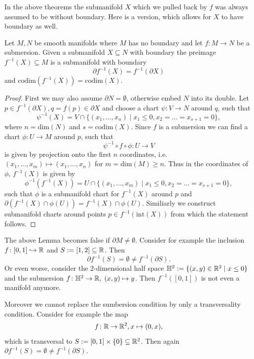     In the above theorems the submanifold $X$ which we pulled back by $f$ was always assumed to be without boundary. Here is a version, which allows for $X$ to have boundary as well.

    \begin{lemma}
        \label{on_mnf_with_boundary:lem:preimage_of_submersion}
            Let $M,N$ be smooth manifolds where $M$ has no boundary and let $f \colon M \to N$ be a submersion. Given a submanifold $X \subseteq N$ with boundary the preimage $f^{-1}(X) \subseteq M$ is a submanifold with boundary 
            \[
            \partial f^{-1}(X) = f^{-1}(\partial X)
            \]
            and $\mathrm{codim}(f^{-1}(X)) = \mathrm{codim}(X)$. 
        \end{lemma}
        \begin{proof}
            First we may also assume $\partial N = \emptyset$, otherwise embed $N$ into its double. Let $p \in f^{-1}(\partial X), q = f(p) \in \partial X$ and choose a chart $\psi \colon V \to N$ around $q$, such that 
            \[
            \psi^{-1}(X) = V \cap \{(x_1,\ldots,x_n) \mid x_1 \leq 0, x_2 = \ldots = x_{s+1} = 0\},
            \]
            where $n = \mathrm{dim}(N)$ and $s = \mathrm{codim}(X)$. Since $f$ is a submersion we can find a chart $\phi \colon U \to M$ around $p$, such that 
            \[
            \psi^{-1} \circ f \circ \phi \colon U \to V
            \]
            is given by projection onto the first $n$ coordinates, i.e. $(x_1,\ldots,x_m) \mapsto (x_1,\ldots, x_n)$ for $m = \mathrm{dim}(M) \geq n$. Thus in the coordinates of $\phi$, $f^{-1}(X)$ is given by 
            \[
            \phi^{-1}(f^{-1}(X)) = U \cap \{(x_1,\ldots,x_m) \mid x_1 \leq 0, x_2 = \ldots = x_{s+1} = 0\},
            \]
            such that $\phi$ is a submanifold chart for $f^{-1}(X)$ around $p$ and $\partial(f^{-1}(X) \cap \phi(U)) = f^{-1}(X) \cap \phi(U)$. Similiarly we construct submanifold charts around points $p \in f^{-1}(\mathrm{int}(X))$ from which the statement follows.
        \end{proof}

        \begin{remark}
            The above Lemma becomes false if $\partial M \neq \emptyset$. Consider for example the inclusion $f \colon [0,1] \hookrightarrow \mathbb{R}$ and $S := [1,2] \subseteq \mathbb{R}$. Then 
            \[
            \partial f^{-1}(S) = \emptyset \neq f^{-1}(\partial S).
            \]
            Or even worse, consider the $2$-dimensional half space $\mathbb{H}^2 := \{(x,y) \in \mathbb{R}^2 \mid x \leq 0\}$ and the submersion $f \colon \mathbb{H}^2 \to \mathbb{R}, \; (x,y) \mapsto y$. Then $f^{-1}([0,1])$ is not even a manifold anymore.
            
            Moreover we cannot replace the sumbersion condition by only a transversality condition. Consider for example the map 
            \[
            f \colon \mathbb{R} \to \mathbb{R}^2, x \mapsto (0,x),
            \]
            which is transversal to $S := [0,1] \times \{0\} \subseteq \mathbb{R}^2$. Then again $\partial f^{-1}(S) = \emptyset \neq f^{-1}(\partial S)$.
        \end{remark}
    
 